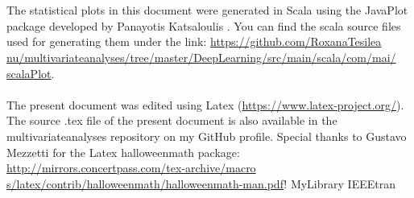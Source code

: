 \documentclass {article}
\begin{document}
\\
\\
The statistical plots in this document were generated in Scala using the JavaPlot package developed by Panayotis Katsaloulis \cite{panayotis_javaplot_2017}. You can find the scala source files used for generating them under the link: 
\href{https://github.com/RoxanaTesileanu/multivariate_analyses/tree/master/DeepLearning/src/main/scala/com/mai/scalaPlot}{https://github.com/RoxanaTesilea\\nu/multivariate\underline{\space}analyses/tree/master/DeepLearning/src/main/scala/com/mai/\\scalaPlot}.  
\\
\\
The present document was edited using Latex \cite{claudio_latex-tutorial.com_nodate} (\href{https://www.latex-project.org/}{https://www.latex-project.org/}). The source .tex file of the present document is also available in the multivariate\underline{\space}analyses repository on my GitHub profile. Special thanks to Gustavo Mezzetti for the Latex halloweenmath package:
\href{http://mirrors.concertpass.com/tex-archive/macros/latex/contrib/halloweenmath/halloweenmath-man.pdf}{http://mirrors.concertpass.com/tex-archive/macro\\s/latex/contrib/halloweenmath/halloweenmath-man.pdf}!  
 {MyLibrary}
 {IEEEtran}
\end{document}
